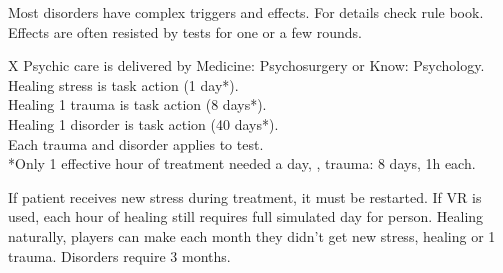 \begin{itemize}
    \itembox Most disorders have complex triggers and effects. For details check rule book.
    \itembox Effects are often resisted by  tests for one or a few rounds.
\end{itemize}

\bigskip

\begin{eptable}{ X }
   Psychic care is delivered by Medicine: Psychosurgery or Know: Psychology.\\
   Healing  stress is task action (\num{1} day*).\\
   Healing 1 trauma is task action (\num{8} days*).\\
   Healing 1 disorder is task action (\num{40} days*).\\
   Each trauma and disorder applies  to test.\\
   *Only \num{1} effective hour of treatment needed a day, \eg, trauma: 8 days, 1h each.\\
\end{eptable}

\begin{itemize}
    \itembox If patient receives new stress during treatment, it must be restarted.
    \itembox If VR is used, each hour of healing still requires full simulated day for person.
    \itembox Healing naturally, players can make  each month they didn't get new
            stress, healing  or \num{1} trauma. Disorders require \num{3} months.
\end{itemize}
